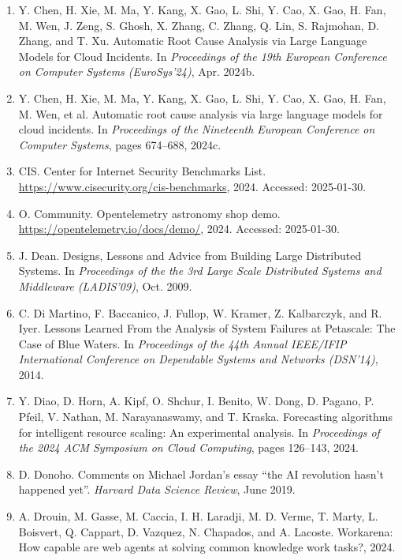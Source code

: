 \documentclass[10pt,UTF8,fontset=fandol]{ctexart}
\begin{document}
\begin{enumerate}[leftmargin=2em,itemsep=2pt]
\item Y. Chen, H. Xie, M. Ma, Y. Kang, X. Gao, L. Shi, Y. Cao, X. Gao, H. Fan, M. Wen, J. Zeng, S. Ghosh, X. Zhang, C. Zhang, Q. Lin, S. Rajmohan, D. Zhang, and T. Xu. Automatic Root Cause Analysis via Large Language Models for Cloud Incidents. In \textit{Proceedings of the 19th European Conference on Computer Systems (EuroSys'24)}, Apr. 2024b.

\item Y. Chen, H. Xie, M. Ma, Y. Kang, X. Gao, L. Shi, Y. Cao, X. Gao, H. Fan, M. Wen, et al. Automatic root cause analysis via large language models for cloud incidents. In \textit{Proceedings of the Nineteenth European Conference on Computer Systems}, pages 674--688, 2024c.

\item CIS. Center for Internet Security Benchmarks List. \url{https://www.cisecurity.org/cis-benchmarks}, 2024. Accessed: 2025-01-30.

\item O. Community. Opentelemetry astronomy shop demo. \url{https://opentelemetry.io/docs/demo/}, 2024. Accessed: 2025-01-30.

\item J. Dean. Designs, Lessons and Advice from Building Large Distributed Systems. In \textit{Proceedings of the the 3rd Large Scale Distributed Systems and Middleware (LADIS'09)}, Oct. 2009.

\item C. Di Martino, F. Baccanico, J. Fullop, W. Kramer, Z. Kalbarczyk, and R. Iyer. Lessons Learned From the Analysis of System Failures at Petascale: The Case of Blue Waters. In \textit{Proceedings of the 44th Annual IEEE/IFIP International Conference on Dependable Systems and Networks (DSN'14)}, 2014.

\item Y. Diao, D. Horn, A. Kipf, O. Shchur, I. Benito, W. Dong, D. Pagano, P. Pfeil, V. Nathan, M. Narayanaswamy, and T. Kraska. Forecasting algorithms for intelligent resource scaling: An experimental analysis. In \textit{Proceedings of the 2024 ACM Symposium on Cloud Computing}, pages 126--143, 2024.

\item D. Donoho. Comments on Michael Jordan's essay ``the AI revolution hasn't happened yet''. \textit{Harvard Data Science Review}, June 2019.

\item A. Drouin, M. Gasse, M. Caccia, I. H. Laradji, M. D. Verme, T. Marty, L. Boisvert, Q. Cappart, D. Vazquez, N. Chapados, and A. Lacoste. Workarena: How capable are web agents at solving common knowledge work tasks?, 2024.


\end{enumerate}
\end{document}
